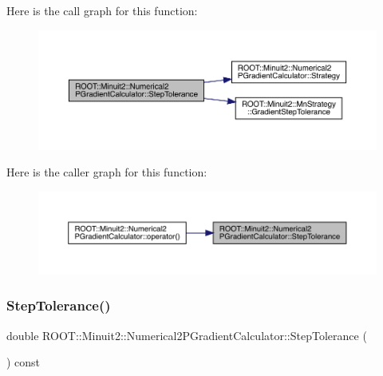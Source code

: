 Here is the call graph for this function\+:
\nopagebreak
\begin{figure}[H]
\begin{center}
\leavevmode
\includegraphics[width=350pt]{d0/d82/classROOT_1_1Minuit2_1_1Numerical2PGradientCalculator_afb1bbda7e079db02b02b790e0b0f6cca_cgraph}
\end{center}
\end{figure}
Here is the caller graph for this function\+:
\nopagebreak
\begin{figure}[H]
\begin{center}
\leavevmode
\includegraphics[width=350pt]{d0/d82/classROOT_1_1Minuit2_1_1Numerical2PGradientCalculator_afb1bbda7e079db02b02b790e0b0f6cca_icgraph}
\end{center}
\end{figure}
\mbox{\label{classROOT_1_1Minuit2_1_1Numerical2PGradientCalculator_afb1bbda7e079db02b02b790e0b0f6cca}} 
\subsubsection{\texorpdfstring{StepTolerance()}{StepTolerance()}\hspace{0.1cm}{\footnotesize\ttfamily [2/3]}}
{\footnotesize\ttfamily double R\+O\+O\+T\+::\+Minuit2\+::\+Numerical2\+P\+Gradient\+Calculator\+::\+Step\+Tolerance (\begin{DoxyParamCaption}{ }\end{DoxyParamCaption}) const}

